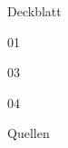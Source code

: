 \documentclass[11pt]{scrreprt}
\begin{document}
\setcounter{page}{1}   %

{Deckblatt}

\setcounter{chapter}{0} 
\tableofcontents %
\pagebreak

% 




{01}


{03}

{04}


{Quellen}

% 
\end{document}

